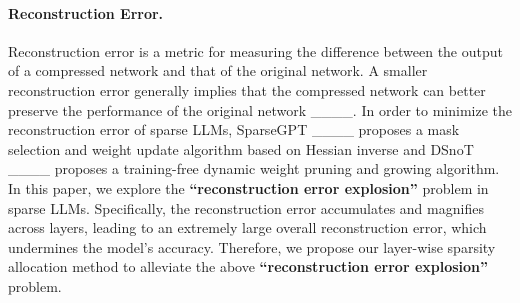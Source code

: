 \paragraph{Reconstruction Error.} Reconstruction error is a metric for measuring the difference between the output of a compressed network and that of the original network. A smaller reconstruction error generally implies that the compressed network can better preserve the performance of the original network ____. In order to minimize the reconstruction error of sparse LLMs, SparseGPT ____ proposes a mask selection and weight update algorithm based on Hessian inverse and DSnoT ____ proposes a training-free dynamic weight pruning and growing algorithm. In this paper, we explore the \textbf{``reconstruction error explosion''} problem in sparse LLMs. Specifically, the reconstruction error accumulates and magnifies across layers, leading to an extremely large overall reconstruction error, which undermines the model's accuracy. Therefore, we propose our layer-wise sparsity allocation method to alleviate the above \textbf{``reconstruction error explosion''} problem.